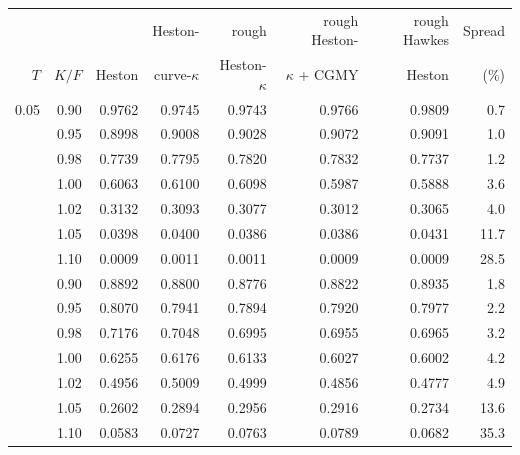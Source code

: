\begin{tabular}{rrrrrrrr}
\toprule
 &  &  & Heston- & rough & rough Heston- & rough Hawkes & Spread\\
$T$ & $K/F$ & Heston & curve-$\kappa$ & Heston-$\kappa$ & $\kappa$ + CGMY & Heston & (\%)\\
\midrule
0.05 & 0.90 & 0.9762 & 0.9745 & 0.9743 & 0.9766 & 0.9809 & 0.7\\
 & 0.95 & 0.8998 & 0.9008 & 0.9028 & 0.9072 & 0.9091 & 1.0\\
 & 0.98 & 0.7739 & 0.7795 & 0.7820 & 0.7832 & 0.7737 & 1.2\\
 & 1.00 & 0.6063 & 0.6100 & 0.6098 & 0.5987 & 0.5888 & 3.6\\
 & 1.02 & 0.3132 & 0.3093 & 0.3077 & 0.3012 & 0.3065 & 4.0\\
 & 1.05 & 0.0398 & 0.0400 & 0.0386 & 0.0386 & 0.0431 & 11.7\\
 & 1.10 & 0.0009 & 0.0011 & 0.0011 & 0.0009 & 0.0009 & 28.5\\
\addlinespace
0.25 & 0.90 & 0.8892 & 0.8800 & 0.8776 & 0.8822 & 0.8935 & 1.8\\
 & 0.95 & 0.8070 & 0.7941 & 0.7894 & 0.7920 & 0.7977 & 2.2\\
 & 0.98 & 0.7176 & 0.7048 & 0.6995 & 0.6955 & 0.6965 & 3.2\\
 & 1.00 & 0.6255 & 0.6176 & 0.6133 & 0.6027 & 0.6002 & 4.2\\
 & 1.02 & 0.4956 & 0.5009 & 0.4999 & 0.4856 & 0.4777 & 4.9\\
 & 1.05 & 0.2602 & 0.2894 & 0.2956 & 0.2916 & 0.2734 & 13.6\\
 & 1.10 & 0.0583 & 0.0727 & 0.0763 & 0.0789 & 0.0682 & 35.3\\
\bottomrule
\end{tabular}
